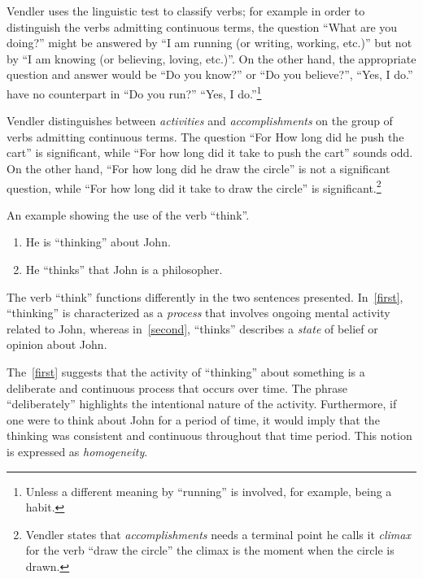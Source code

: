 Vendler uses the linguistic test to classify verbs; for example in order to distinguish the verbs admitting continuous terms, the question ``What are you doing?'' might be answered by
``I am running (or writing, working, etc.)''
but not by ``I am knowing (or believing, loving, etc.)''.
On the other hand, the appropriate question and answer would be ``Do you know?'' or ``Do you believe?'',
``Yes, I do.'' have no counterpart in ``Do you run?'' ``Yes, I do.''\footnote{Unless a different meaning by ``running'' is involved, for example, being a habit.}

Vendler distinguishes between \textit{activities} and \textit{accomplishments} on the group of verbs admitting continuous terms. The question
``For How long did he push the cart'' is significant, while ``For how long did it take to push the cart'' sounds odd. On the other hand,
``For how long did he draw the circle'' is not a significant question, while ``For how long did it take to draw the circle'' is significant.\footnote{Vendler states that \textit{accomplishments} needs a terminal point he calls it \textit{climax} for the verb ``draw the circle'' the climax is the moment when the circle is drawn.}


\begin{exmp} An example showing the use of the verb ``think''.
	\begin{enumerate}[label=(\arabic*)]
		\item He is ``thinking'' about John. \label{first}
		\item He ``thinks'' that John is a philosopher. \label{second}
	\end{enumerate}

	The verb ``think'' functions differently in the two sentences presented. In~\ref{first}, ``thinking'' is characterized as a \textit{process} that involves ongoing mental activity related to John, whereas in~\ref{second}, ``thinks'' describes a \textit{state} of belief or opinion about John.

	The~\ref{first} suggests that the activity of ``thinking'' about something is a deliberate and continuous process that occurs over time. The phrase ``deliberately'' highlights the intentional nature of the activity. Furthermore, if one were to think about John for a period of time, it would imply that the thinking was consistent and continuous throughout that time period. This notion is expressed as \textit{homogeneity}.
\end{exmp}



